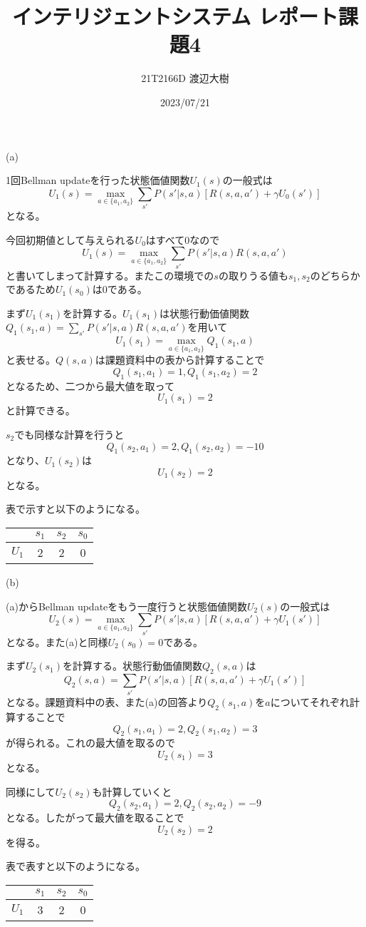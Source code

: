 \documentclass[a4paper,11pt,dvipdfmx]{jsarticle}
\begin{document}
\title{インテリジェントシステム レポート課題4}
\author{21T2166D 渡辺大樹}
\date{2023/07/21}
\maketitle

\section{}
(a)

1回Bellman updateを行った状態価値関数$U_1(s)$の一般式は
\[U_1(s)=\max_{a\in\{a_1,a_2\}}\sum_{s'}P(s'|s,a)[R(s,a,a')+\gamma U_0(s')]\]
となる。

今回初期値として与えられる$U_0$はすべて0なので
\[U_1(s)=\max_{a\in\{a_1,a_2\}}\sum_{s'}P(s'|s,a)R(s,a,a')\]
と書いてしまって計算する。またこの環境での$s$の取りうる値も$s_1,s_2$のどちらかであるため$U_1(s_0)$は0である。

まず$U_1(s_1)$を計算する。$U_1(s_1)$は状態行動価値関数$Q_1(s_1,a)=\sum_{s'}P(s'|s,a)R(s,a,a')$を用いて
\[U_1(s_1)=\max_{a\in\{a_1,a_2\}}Q_1(s_1,a)\]
と表せる。$Q(s,a)$は課題資料中の表から計算することで
\[Q_1(s_1,a_1)=1,Q_1(s_1,a_2)=2\]
となるため、二つから最大値を取って
\[U_1(s_1)=2\]
と計算できる。

$s_2$でも同様な計算を行うと
\[Q_1(s_2,a_1)=2,Q_1(s_2,a_2)=-10\]
となり、$U_1(s_2)$は
\[U_1(s_2)=2\]
となる。

表で示すと以下のようになる。
\begin{center}
    \begin{tabular}[h]{|c|c|c|c|} \hline
              & $s_1$ & $s_2$ & $s_0$ \\ \hline
        $U_1$ &   2   &   2   &   0   \\ \hline
    \end{tabular}
\end{center}

(b)

(a)からBellman updateをもう一度行うと状態価値関数$U_2(s)$の一般式は
\[U_2(s)=\max_{a\in\{a_1,a_2\}}\sum_{s'}P(s'|s,a)[R(s,a,a')+\gamma U_1(s')]\]
となる。また(a)と同様$U_2(s_0)=0$である。

まず$U_2(s_1)$を計算する。状態行動価値関数$Q_2(s,a)$は
\[Q_2(s,a)=\sum_{s'}P(s'|s,a)[R(s,a,a')+\gamma U_1(s')]\]
となる。課題資料中の表、また(a)の回答より$Q_2(s_1,a)$を$a$についてそれぞれ計算することで
\[Q_2(s_1,a_1)=2,Q_2(s_1,a_2)=3\]
が得られる。これの最大値を取るので
\[U_2(s_1)=3\]
となる。

同様にして$U_2(s_2)$も計算していくと
\[Q_2(s_2,a_1)=2,Q_2(s_2,a_2)=-9\]
となる。したがって最大値を取ることで
\[U_2(s_2)=2\]
を得る。

表で表すと以下のようになる。
\begin{center}
    \begin{tabular}[h]{|c|c|c|c|} \hline
              & $s_1$ & $s_2$ & $s_0$ \\ \hline
        $U_1$ &   3   &   2   &   0   \\ \hline
    \end{tabular}
\end{center}
\end{document}
